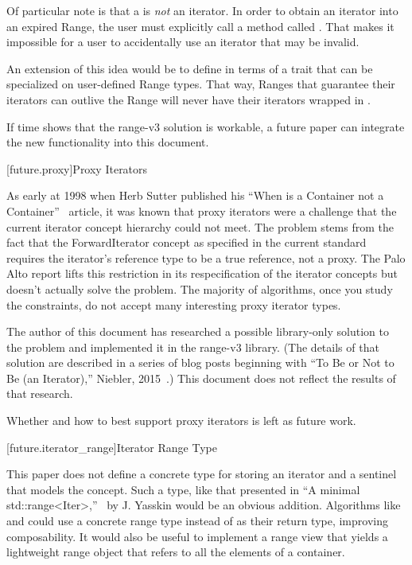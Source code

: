 \pnum
Of particular note is that a  is \textit{not} an iterator. In order to
obtain an iterator into an expired Range, the user must explicitly call a method called
. That makes it impossible for a user to accidentally use an iterator that may be
invalid.

\pnum
An extension of this idea would be to define  in terms of a trait that can be
specialized on user-defined Range types. That way, Ranges that guarantee their iterators can
outlive the Range will never have their iterators wrapped in .

\pnum
If time shows that the range-v3 solution is workable, a future paper can integrate the new
functionality into this document.

[future.proxy]{Proxy Iterators}

\pnum
As early at 1998 when Herb Sutter published his ``When is a Container not a Container''~\cite{Sutter1998}
article, it was known that proxy iterators were a challenge that the current iterator concept
hierarchy could not meet. The problem stems from the fact that the ForwardIterator concept as
specified in the current standard requires the iterator's reference type to be a true reference, not
a proxy. The Palo Alto report lifts this restriction in its respecification of the iterator
concepts but doesn't actually solve the problem. The majority of algorithms, once you study the
constraints, do not accept many interesting proxy iterator types.

\pnum
The author of this document has researched a possible library-only solution to the problem and
implemented it in the range-v3 library. (The details of that solution are described in a series of
blog posts beginning with ``To Be or Not to Be (an Iterator),'' Niebler, 2015~\cite{niebler2015}.) This
document does not reflect the results of that research.

Whether and how to best support proxy iterators is left as future work.

[future.iterator_range]{Iterator Range Type}

\pnum
This paper does not define a concrete type for storing an iterator and a sentinel that models the
 concept. Such a type, like that presented in ``A minimal std::range<Iter>,''~\cite{yasskin2012}
by J. Yasskin would be an obvious addition. Algorithms like  and
 could use a concrete range type instead of  as their return type,
improving composability. It would also be useful to implement a  range view that
yields a lightweight range object that refers to all the elements of a container.

